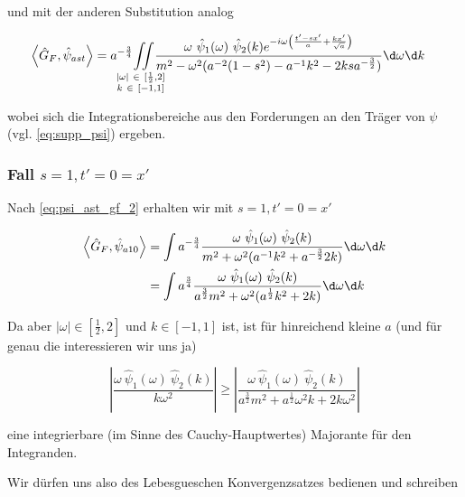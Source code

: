 und mit der anderen Substitution analog

\begin{align}
    \left<  \hat G_F, \hat\psi_{ast} \right>
    &=
    a^{-\frac{3}{4}}
    \kern -1em
    \iint \limits_{\substack{
        |\omega|~ \in~ [\frac{1}{2},2] \\
        k ~\in~ [-1,1]
        }
    }
    \kern -1em
    \frac{
        \omega ~\hat \psi_1(\omega) ~\hat \psi_2(k)
        e^{-i \omega \left(\frac{t' - sx'}{a} + \frac{kx'}{\sqrt{a}}\right)}
    }
    {
        m^2 - \omega^2(a^{-2}(1-s^2)-a^{-1}k^2 - 2 k s a^{-\frac{3}{2}})
    }
    \d \omega \d k
    \label{eq:psi_ast_gf_2}
\end{align}

wobei sich die Integrationsbereiche aus den Forderungen an den Träger von $\psi$
(vgl. \eqref{eq:supp_psi}) ergeben.


\subsubsection*{Fall $s=1, t' = 0 = x'$}
Nach \eqref{eq:psi_ast_gf_2} erhalten wir mit $s=1, t' = 0 = x'$

\begin{align*}
    \left<  \hat G_F,\hat\psi_{a10} \right>
    &=
    \int a^{-\frac{3}{4}} \frac{
        \omega ~\hat \psi_1(\omega) ~\hat \psi_2(k)
    }
    {
        m^2+\omega^2 (a^{-1}k^2 + a^{-\frac{3}{2}}2 k )
    }
    \d \omega \d k \\
    &=
    \int a^{\frac{3}{4}} \frac{
        \omega ~\hat \psi_1(\omega) ~\hat \psi_2(k)
    }
    {
        a^{\frac{3}{2}} m^2+\omega^2 (a^{\frac{1}{2}}k^2 + 2 k )
    }
    \d \omega \d k
\end{align*}

Da aber $|\omega| \in [\frac{1}{2},2]$ und $k \in [-1,1]$ ist, ist für hinreichend
kleine $a$ (und für genau die interessieren wir uns ja)

\begin{equation*}
    \left|
        \frac{\omega ~\hat \psi_1(\omega) ~\hat \psi_2(k)}{k \omega^2}
    \right|
    \geq
    \left|
        \frac{\omega ~\hat \psi_1(\omega) ~\hat \psi_2(k)}
        {a^{\frac{3}{2}}m^2+a^{\frac{1}{2}}\omega^2 k+2k \omega^2}
    \right|
\end{equation*}

eine integrierbare (im Sinne des Cauchy-Hauptwertes) Majorante für den Integranden.

Wir dürfen uns also des Lebesgueschen Konvergenzsatzes bedienen und schreiben

